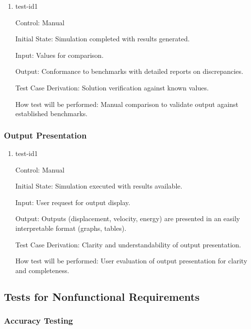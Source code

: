 \documentclass[12pt, titlepage]{article}
\begin{document}
\begin{enumerate}

\item{test-id1\\}

Control: Manual
					
Initial State: Simulation completed with results generated.
					
Input: Values for comparison.
					
Output: Conformance to benchmarks with detailed reports on discrepancies.

Test Case Derivation: Solution verification against known values.
					
How test will be performed: Manual comparison to validate output against established 
benchmarks.

\end{enumerate}


\subsubsection{Output Presentation}

\begin{enumerate}

\item{test-id1\\}

Control: Manual
					
Initial State: Simulation executed with results available.
					
Input: User request for output display.
					
Output: Outputs (displacement, velocity, energy) are presented in an easily interpretable 
format (graphs, tables).

Test Case Derivation: Clarity and understandability of output presentation.
					
How test will be performed: User evaluation of output presentation for clarity and 
completeness.

\end{enumerate}

\subsection{Tests for Nonfunctional Requirements}

\subsubsection{Accuracy Testing}
\end{document}
